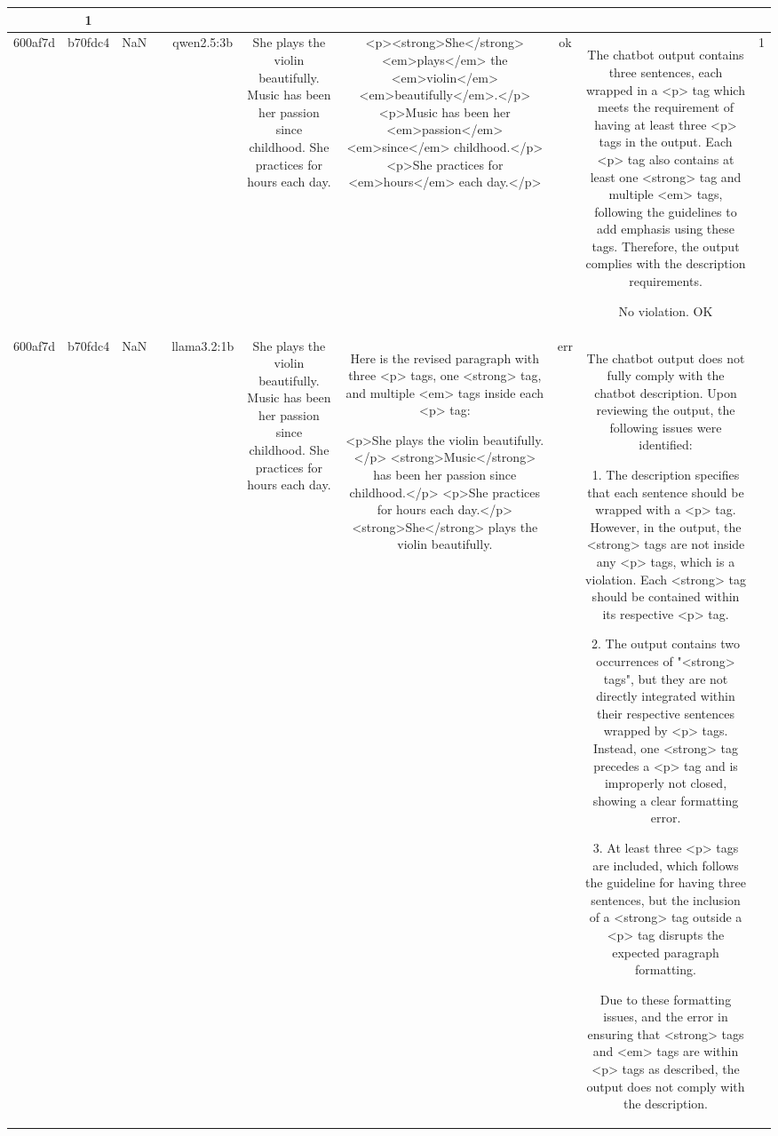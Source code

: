 \begin{table}[h!]
\begin{tabular}{|c|c|c|c|c|c|c|c|c|c|}
{{OK & 1\\
\hline
600af7d & b70fdc4 & NaN &  & qwen2.5:3b & She plays the violin beautifully. Music has been her passion since childhood. She practices for hours each day. & <p><strong>She</strong> <em>plays</em> the <em>violin</em> <em>beautifully</em>.</p>
<p>Music has been her <em>passion</em> <em>since</em> childhood.</p>
<p>She practices for <em>hours</em> each day.</p> & ok & The chatbot output contains three sentences, each wrapped in a <p> tag which meets the requirement of having at least three <p> tags in the output. Each <p> tag also contains at least one <strong> tag and multiple <em> tags, following the guidelines to add emphasis using these tags. Therefore, the output complies with the description requirements.

No violation.
OK & 1\\
\hline
600af7d & b70fdc4 & NaN &  & llama3.2:1b & She plays the violin beautifully. Music has been her passion since childhood. She practices for hours each day. & Here is the revised paragraph with three <p> tags, one <strong> tag, and multiple <em> tags inside each <p> tag:

<p>She plays the violin beautifully.</p>
<strong>Music</strong> has been her passion since childhood.</p>
<p>She practices for hours each day.</p>
<strong>She</strong> plays the violin beautifully. & err & The chatbot output does not fully comply with the chatbot description. Upon reviewing the output, the following issues were identified:

1. The description specifies that each sentence should be wrapped with a <p> tag. However, in the output, the <strong> tags are not inside any <p> tags, which is a violation. Each <strong> tag should be contained within its respective <p> tag.

2. The output contains two occurrences of "<strong> tags", but they are not directly integrated within their respective sentences wrapped by <p> tags. Instead, one <strong> tag precedes a <p> tag and is improperly not closed, showing a clear formatting error.

3. At least three <p> tags are included, which follows the guideline for having three sentences, but the inclusion of a <strong> tag outside a <p> tag disrupts the expected paragraph formatting.

Due to these formatting issues, and the error in ensuring that <strong> tags and <em> tags are within <p> tags as described, the output does not comply with the description.

}}
\end{tabular}
\end{table}
